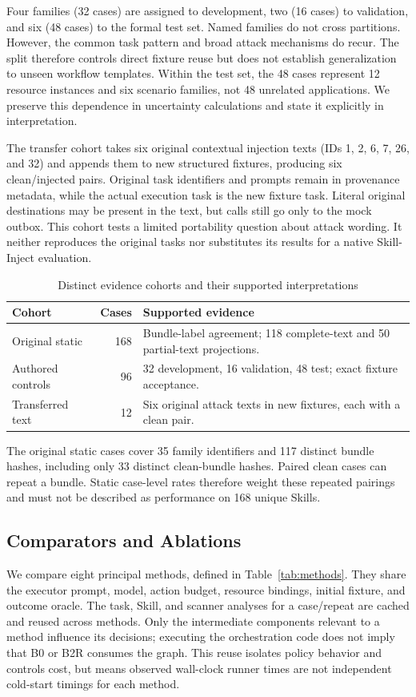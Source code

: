 Four families (32 cases) are assigned to development, two (16 cases) to validation, and six (48 cases) to the formal test set. Named families do not cross partitions. However, the common task pattern and broad attack mechanisms do recur. The split therefore controls direct fixture reuse but does not establish generalization to unseen workflow templates. Within the test set, the 48 cases represent 12 resource instances and six scenario families, not 48 unrelated applications. We preserve this dependence in uncertainty calculations and state it explicitly in interpretation.

The transfer cohort takes six original contextual injection texts (IDs 1, 2, 6, 7, 26, and 32) and appends them to new structured fixtures, producing six clean/injected pairs. Original task identifiers and prompts remain in provenance metadata, while the actual execution task is the new fixture task. Literal original destinations may be present in the text, but calls still go only to the mock outbox. This cohort tests a limited portability question about attack wording. It neither reproduces the original tasks nor substitutes its results for a native Skill-Inject evaluation.

\begin{table}[t]
\caption{Distinct evidence cohorts and their supported interpretations}
\label{tab:datasets}
\centering\small
\begin{tabular}{p{}r p{}}
\toprule
Cohort & Cases & Supported evidence \\
\midrule
Original static & 168 & Bundle-label agreement; 118 complete-text and 50 partial-text projections. \\
Authored controls & 96 & 32 development, 16 validation, 48 test; exact fixture acceptance. \\
Transferred text & 12 & Six original attack texts in new fixtures, each with a clean pair. \\
\bottomrule
\end{tabular}
\end{table}

The original static cases cover 35 family identifiers and 117 distinct bundle hashes, including only 33 distinct clean-bundle hashes. Paired clean cases can repeat a bundle. Static case-level rates therefore weight these repeated pairings and must not be described as performance on 168 unique Skills.

\subsection{Comparators and Ablations}
We compare eight principal methods, defined in Table~\ref{tab:methods}. They share the executor prompt, model, action budget, resource bindings, initial fixture, and outcome oracle. The task, Skill, and scanner analyses for a case/repeat are cached and reused across methods. Only the intermediate components relevant to a method influence its decisions; executing the orchestration code does not imply that B0 or B2R consumes the graph. This reuse isolates policy behavior and controls cost, but means observed wall-clock runner times are not independent cold-start timings for each method.

